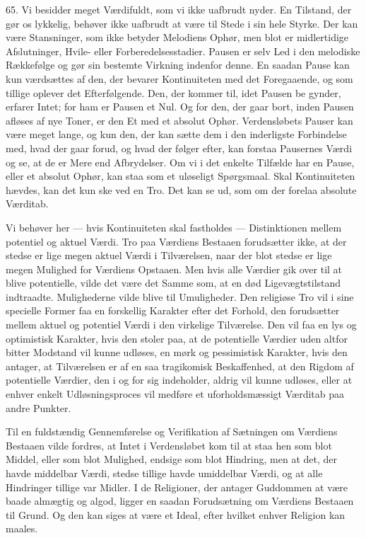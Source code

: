 \documentclass[12pt,a4paper,openany]{book}
\newcommand{\opage}[1]{\marginnote{\footnotesize\textit{[#1]}}}
\begin{document}
65. Vi besidder meget Værdifuldt, som vi ikke uafbrudt nyder. En
Tilstand, der gør os lykkelig, behøver ikke uafbrudt at være til Stede i
sin hele Styrke. Der kan være Stansninger, som ikke betyder Melodiens
Ophør, men blot er midlertidige Afslutninger, Hvile- eller
Forberedelsesstadier. Pausen er selv Led i den melodiske Rækkefølge og
gør sin bestemte Virkning indenfor denne. En saadan Pause kan kun
værdsættes af den, der bevarer Kontinuiteten med det Foregaaende, og som
tillige oplever det Efterfølgende. Den, der kommer til, idet Pausen be%
\opage{150}gynder, erfarer Intet; for ham er Pausen et Nul. Og for den,
der gaar bort, inden Pausen afløses af nye Toner, er den Et med et
absolut Ophør. Verdensløbets Pauser kan være meget lange, og kun den,
der kan sætte dem i den inderligste Forbindelse med, hvad der gaar
forud, og hvad der følger efter, kan forstaa Pausernes Værdi og se, at
de er Mere end Afbrydelser. Om vi i det enkelte Tilfælde har en Pause,
eller et absolut Ophør, kan staa som et uløseligt Spørgsmaal. Skal
Kontinuiteten hævdes, kan det kun ske ved en Tro. Det kan se ud, som om
der forelaa absolute Værditab.

Vi behøver her --- hvis Kontinuiteten skal fastholdes --- Distinktionen
mellem potentiel og aktuel Værdi. Tro paa Værdiens Bestaaen forudsætter
ikke, at der stedse er lige megen aktuel Værdi i Tilværelsen, naar der
blot stedse er lige megen Mulighed for Værdiens Opstaaen. Men hvis alle
Værdier gik over til at blive potentielle, vilde det være det Samme som,
at en død Ligevægtstilstand indtraadte. Mulighederne vilde blive til
Umuligheder. Den religiøse Tro vil i sine specielle Former faa en
forskellig Karakter efter det Forhold, den forudsætter mellem aktuel og
potentiel Værdi i den virkelige Tilværelse. Den vil faa en lys og
optimistisk Karakter, hvis den stoler paa, at de potentielle Værdier
uden altfor bitter Modstand vil kunne udløses, en mørk og pessimistisk
Karakter, hvis den antager, at Tilværelsen er af en saa tragikomisk
Beskaffenhed, at den Rigdom af potentielle Værdier, den i og for sig
indeholder, aldrig vil kunne udløses, eller at enhver enkelt
Udløsningsproces vil medføre et uforholdsmæssigt Værditab paa andre
Punkter.

Til en fuldstændig Gennemførelse og Verifikation af Sætningen om
Værdiens Bestaaen vilde fordres, at Intet i Verdensløbet kom til at staa
hen som blot Middel, eller som blot Mulighed, endsige som blot Hindring,
men at det, der havde middelbar Værdi, stedse tillige havde umiddelbar
Værdi, og at alle Hindringer tillige var Midler. I de Religioner, der
antager Guddommen at være baade almægtig og algod, ligger en saadan
Forudsætning om Værdiens Bestaaen til Grund. Og den kan siges at være et
Ideal, efter hvilket enhver Religion kan maales.
\end{document}
